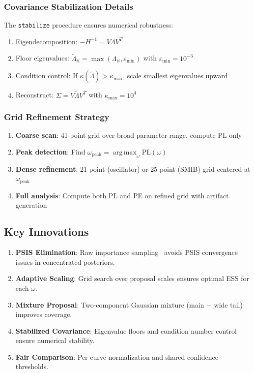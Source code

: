 \documentclass[conference]{IEEEtran}
\DeclareMathOperator*{\argmax}{arg\,max}
\begin{document}
\subsubsection{Covariance Stabilization Details}
The \texttt{stabilize} procedure ensures numerical robustness:
\begin{enumerate}
\item Eigendecomposition: $-H^{-1} = V \Lambda V^T$
\item Floor eigenvalues: $\tilde{\Lambda}_{ii} = \max(\Lambda_{ii}, \varepsilon_{\min})$ with $\varepsilon_{\min} = 10^{-3}$
\item Condition control: If $\kappa(\tilde{\Lambda}) > \kappa_{\max}$, scale smallest eigenvalues upward
\item Reconstruct: $\Sigma = V \tilde{\Lambda} V^T$ with $\kappa_{\max} = 10^4$
\end{enumerate}

\subsubsection{Grid Refinement Strategy}
\begin{enumerate}
\item \textbf{Coarse scan}: 41-point grid over broad parameter range, compute PL only
\item \textbf{Peak detection}: Find $\omega_{\text{peak}} = \argmax_{\omega} \text{PL}(\omega)$
\item \textbf{Dense refinement}: 21-point (oscillator) or 25-point (SMIB) grid centered at $\omega_{\text{peak}}$ 
\item \textbf{Full analysis}: Compute both PL and PE on refined grid with artifact generation
\end{enumerate}

\subsection{Key Innovations}

\begin{enumerate}
\item \textbf{PSIS Elimination}: Raw importance sampling~\cite{robert2004} avoids PSIS convergence issues in concentrated posteriors.
\item \textbf{Adaptive Scaling}: Grid search over proposal scales ensures optimal ESS for each $\omega$.
\item \textbf{Mixture Proposal}: Two-component Gaussian mixture (main + wide tail) improves coverage.
\item \textbf{Stabilized Covariance}: Eigenvalue floors and condition number control ensure numerical stability.
\item \textbf{Fair Comparison}: Per-curve normalization and shared confidence thresholds.
\end{enumerate}
\end{document}
